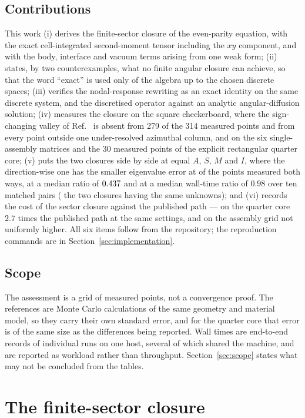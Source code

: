 \documentclass[11pt,a4paper]{article}
\begin{document}
\subsection{Contributions}
This work (i) derives the finite-sector closure of the even-parity equation, with
the exact cell-integrated second-moment tensor including the $xy$ component, and
with the body, interface and vacuum terms arising from one weak form;
(ii) states, by two counterexamples, what no finite angular closure can achieve, so
that the word ``exact'' is used only of the algebra up to the chosen discrete
spaces; (iii) verifies the nodal-response rewriting as an exact identity on the
same discrete system, and the discretised operator against an analytic
angular-diffusion solution; (iv) measures the closure on the square checkerboard, where the sign-changing valley
of Ref.~\cite{openpsn2026} is absent from 279 of the 314 measured points and from every
point outside one under-resolved azimuthal column, and on the six single-assembly
matrices and the 30 measured points of the explicit rectangular quarter core; (v) puts
the two closures side by side at equal $A$, $S$, $M$ and $I$, where the direction-wise
one has the smaller eigenvalue error at \StudyFourSmaller{} of the \StudyFourPairs{} points measured both ways, at a
median ratio of $0.437$ and at a median wall-time ratio of $0.98$ over ten matched pairs (
the two closures having the same unknowns); and (vi) records the cost of the sector
closure against the published path --- on the quarter core $2.7$ times the published
path at the same settings, and on the assembly grid not uniformly higher. All six
items follow from the repository; the reproduction commands are in
Section~\ref{sec:implementation}.

\subsection{Scope}
The assessment is a grid of measured points, not a convergence proof. The
references are Monte Carlo calculations of the same geometry and material model, so
they carry their own standard error, and for the quarter core that error is of the
same size as the differences being reported. Wall times are end-to-end records of
individual runs on one host, several of which shared the machine, and are reported
as workload rather than throughput. Section~\ref{sec:scope} states what may not be
concluded from the tables.

\section{The finite-sector closure}
\label{sec:method}
\end{document}
